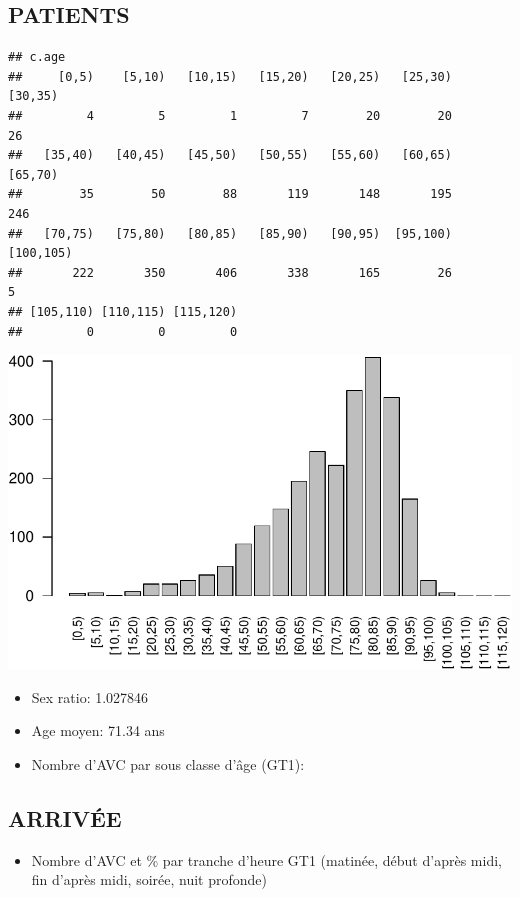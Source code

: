 \documentclass[]{article}
\begin{document}
\subsection{PATIENTS}\label{patients}

\begin{verbatim}
## c.age
##     [0,5)    [5,10)   [10,15)   [15,20)   [20,25)   [25,30)   [30,35) 
##         4         5         1         7        20        20        26 
##   [35,40)   [40,45)   [45,50)   [50,55)   [55,60)   [60,65)   [65,70) 
##        35        50        88       119       148       195       246 
##   [70,75)   [75,80)   [80,85)   [85,90)   [90,95)  [95,100) [100,105) 
##       222       350       406       338       165        26         5 
## [105,110) [110,115) [115,120) 
##         0         0         0
\end{verbatim}

\includegraphics{analyse_merge_files/figure-latex/patients-1.pdf}

\begin{itemize}
\itemsep1pt\parskip0pt
\item
  Sex ratio: 1.027846
\item
  Age moyen: 71.34 ans
\item
  Nombre d'AVC par sous classe d'âge (GT1):
\end{itemize}

\subsection{ARRIVÉE}\label{arrivee}

\begin{itemize}
\itemsep1pt\parskip0pt
\item
  Nombre d'AVC et \% par tranche d'heure GT1 (matinée, début d'après
  midi, fin d'après midi, soirée, nuit profonde)
\end{itemize}
\end{document}
